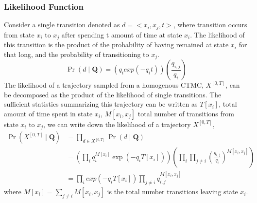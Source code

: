 \subsubsection{Likelihood Function}
Consider a single transition denoted as $ d = <x_{i},x_{j},t> $, where transition occurs from state $ x_{i} $ to $ x_{j} $ after spending t amount of time at state $ x_{i} $. The likelihood of this transition is the product of the probability of having remained at state $ x_{i} $ for that long, and the probability of transitioning to $ x_{j} $.
\begin{equation}
\operatorname{Pr}(d  \mid \textbf{Q}) = \left( q_{i}exp(-q_{i}t) \right) \left( \frac{q_{i,j}}{q_{i}} \right)
\end{equation}
The likelihood of a trajectory sampled from a homogenous CTMC, $ X^{[0,T]} $, can be decomposed as the product of the likelihood of single transitions. The sufficient statistics summarizing this trajectory can be written as $ T[x_{i}] $, total amount of time spent in state $ x_{i} $, $ M[x_{i}, x_{j}] $ total number of transitions from state $ x_{i} $ to $ x_{j} $, we can write down the likelihood of a trajectory $  X^{\left[0,T\right] } $,
\begin{align}
\operatorname{Pr}(X^{[0,T]}  \mid \textbf{Q}) &=  \prod_{d \in X^{[0,T]}} \operatorname{Pr}(d \mid \textbf{Q}) \nonumber\\&=\left(\prod_{ i} q_{i}^{M[x_{i}]} \exp \left(-q_{i} T[x_{i}]\right)\right)\left(\prod_{ i} \prod_{ j \neq i} \left(\frac{q_{i,j}}{q_{i}}\right)^{M\left[x_{i}, x_{j}\right]}\right) \nonumber\\ & = \prod_{i}  exp(-q_{i}T[x_{i}]) \prod_{j \neq i}  q_{i,j}^{M[x_{i},x_{j}]}
\label{eq:lh_traj_homo}
\end{align}
where $ M[x_{i}] = \sum_{j \neq i} M[x_{i}, x_{j}] $ is the total number transitions leaving state $ x_{i} $.


